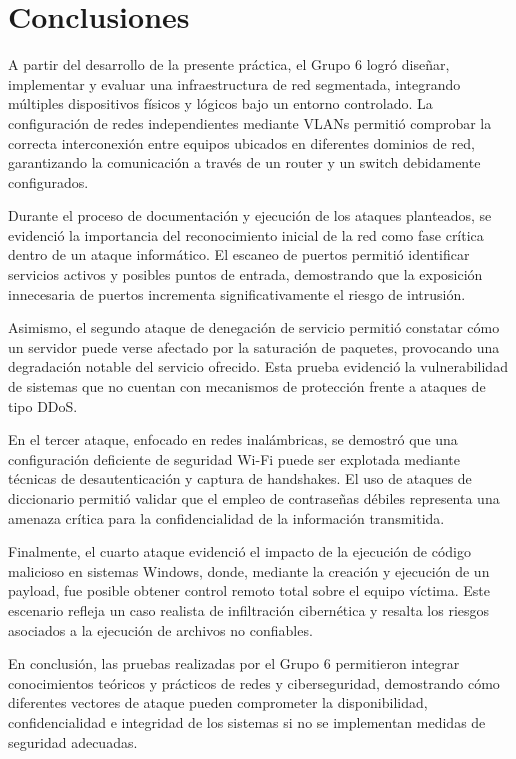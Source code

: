 \section{Conclusiones}

A partir del desarrollo de la presente práctica, el Grupo 6 logró diseñar, implementar y evaluar una infraestructura de red segmentada, integrando múltiples dispositivos físicos y lógicos bajo un entorno controlado. La configuración de redes independientes mediante VLANs permitió comprobar la correcta interconexión entre equipos ubicados en diferentes dominios de red, garantizando la comunicación a través de un router y un switch debidamente configurados.

Durante el proceso de documentación y ejecución de los ataques planteados, se evidenció la importancia del reconocimiento inicial de la red como fase crítica dentro de un ataque informático. El escaneo de puertos permitió identificar servicios activos y posibles puntos de entrada, demostrando que la exposición innecesaria de puertos incrementa significativamente el riesgo de intrusión.

Asimismo, el segundo ataque de denegación de servicio permitió constatar cómo un servidor puede verse afectado por la saturación de paquetes, provocando una degradación notable del servicio ofrecido. Esta prueba evidenció la vulnerabilidad de sistemas que no cuentan con mecanismos de protección frente a ataques de tipo DDoS.

En el tercer ataque, enfocado en redes inalámbricas, se demostró que una configuración deficiente de seguridad Wi-Fi puede ser explotada mediante técnicas de desautenticación y captura de handshakes. El uso de ataques de diccionario permitió validar que el empleo de contraseñas débiles representa una amenaza crítica para la confidencialidad de la información transmitida.

Finalmente, el cuarto ataque evidenció el impacto de la ejecución de código malicioso en sistemas Windows, donde, mediante la creación y ejecución de un payload, fue posible obtener control remoto total sobre el equipo víctima. Este escenario refleja un caso realista de infiltración cibernética y resalta los riesgos asociados a la ejecución de archivos no confiables.

En conclusión, las pruebas realizadas por el Grupo 6 permitieron integrar conocimientos teóricos y prácticos de redes y ciberseguridad, demostrando cómo diferentes vectores de ataque pueden comprometer la disponibilidad, confidencialidad e integridad de los sistemas si no se implementan medidas de seguridad adecuadas.
